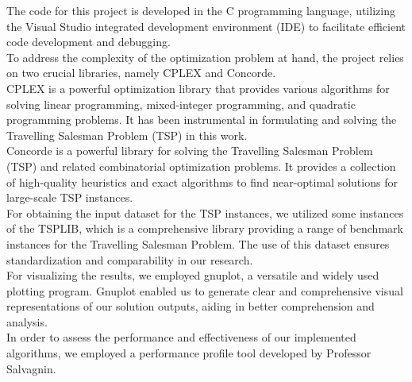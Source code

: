 The code for this project is developed in the C programming language, utilizing the Visual Studio integrated development environment (IDE) to facilitate efficient code development and debugging.
\\To address the complexity of the optimization problem at hand, the project relies on two crucial libraries, namely CPLEX \cite{CPLEX} and Concorde. \\CPLEX is a powerful optimization library that provides various algorithms for solving linear programming, mixed-integer programming, and quadratic programming problems. It has been instrumental in formulating and solving the Travelling Salesman Problem (TSP) in this work.
\\
Concorde is a powerful library for solving the Travelling Salesman Problem (TSP) and related combinatorial optimization problems. It provides a collection of high-quality heuristics and exact algorithms to find near-optimal solutions for large-scale TSP instances. 
\\
For obtaining the input dataset for the TSP instances, we utilized some instances of the TSPLIB, which is a comprehensive library providing a range of benchmark instances for the Travelling Salesman Problem. The use of this dataset ensures standardization and comparability in our research.
\\
For visualizing the results, we employed gnuplot, a versatile and widely used plotting program. Gnuplot \cite{gnuplot} enabled us to generate clear and comprehensive visual representations of our solution outputs, aiding in better comprehension and analysis.
\\
In order to assess the performance and effectiveness of our implemented algorithms, we employed a performance profile tool developed by Professor Salvagnin.
